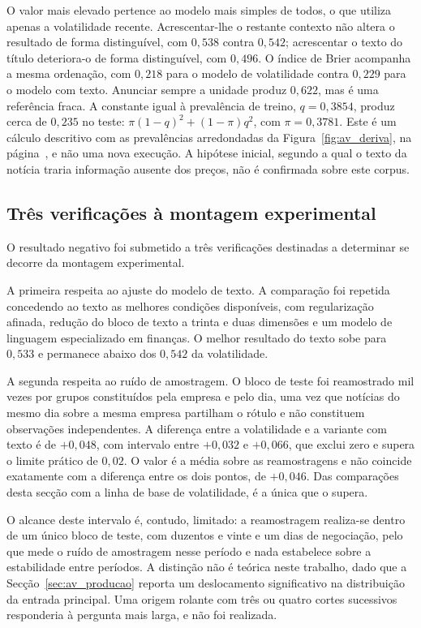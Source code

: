 O valor mais elevado pertence ao modelo mais simples de todos, o que utiliza apenas a volatilidade
recente. Acrescentar-lhe o restante contexto não altera o resultado de forma distinguível, com
$0{,}538$ contra $0{,}542$; acrescentar o texto do título deteriora-o de forma distinguível, com
$0{,}496$. O índice de Brier acompanha a mesma ordenação, com $0{,}218$ para o modelo de
volatilidade contra $0{,}229$ para o modelo com texto. Anunciar sempre a unidade produz $0{,}622$,
mas é uma referência fraca. A constante igual à prevalência de treino, $q=0{,}3854$, produz cerca de
$0{,}235$ no teste: $\pi(1-q)^2+(1-\pi)q^2$, com $\pi=0{,}3781$. Este é um cálculo descritivo
com as prevalências arredondadas da Figura~\ref{fig:av_deriva}, na página~\pageref{fig:av_deriva}, e não uma nova execução. A hipótese inicial, segundo a qual o texto da notícia traria informação ausente dos preços,
não é confirmada sobre este corpus.

\subsection{Três verificações à montagem experimental}

O resultado negativo foi submetido a três verificações destinadas a determinar se decorre da montagem
experimental.

A primeira respeita ao ajuste do modelo de texto. A comparação foi repetida concedendo ao texto as
melhores condições disponíveis, com regularização afinada, redução do bloco de texto a trinta e duas
dimensões e um modelo de linguagem especializado em finanças. O melhor resultado do texto sobe para
$0{,}533$ e permanece abaixo dos $0{,}542$ da volatilidade.

A segunda respeita ao ruído de amostragem. O bloco de teste foi reamostrado mil vezes por grupos
constituídos pela empresa e pelo dia, uma vez que notícias do mesmo dia sobre a mesma empresa
partilham o rótulo e não constituem observações independentes. A diferença entre a volatilidade e a
variante com texto é de $+0{,}048$, com intervalo entre $+0{,}032$ e $+0{,}066$, que exclui zero e
supera o limite prático de $0{,}02$. O valor é a média sobre as reamostragens e não coincide
exatamente com a diferença entre os dois pontos, de $+0{,}046$. Das comparações desta secção com
a linha de base de volatilidade, é a única que o supera.

O alcance deste
intervalo é, contudo, limitado: a reamostragem realiza-se dentro de
um único bloco de teste, com duzentos e vinte e um dias de negociação, pelo que mede o ruído de
amostragem nesse período e nada estabelece sobre a estabilidade entre períodos. A distinção não é
teórica neste trabalho, dado que a Secção~\ref{sec:av_producao} reporta um deslocamento significativo
na distribuição da entrada principal. Uma origem rolante com três ou quatro cortes sucessivos
responderia à pergunta mais larga, e não foi realizada.

